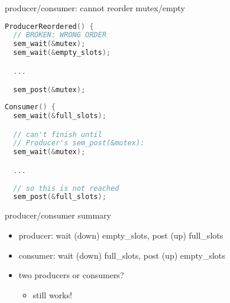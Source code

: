 \begin{frame}[fragile,label=noReorderEmpty]{producer/consumer: cannot reorder mutex/empty}
\begin{minipage}{0.45\textwidth}
\begin{lstlisting}[language=C++,style=smaller]
ProducerReordered() {
  // BROKEN: WRONG ORDER
  sem_wait(&mutex);
  sem_wait(&empty_slots);

  ...

  sem_post(&mutex);
\end{lstlisting}
\end{minipage}
\begin{minipage}{0.45\textwidth}
\begin{lstlisting}[language=C++,style=smaller]
Consumer() {
  sem_wait(&full_slots);

  // can't finish until
  // Producer's sem_post(&mutex):
  sem_wait(&mutex);

  ...
    
  // so this is not reached
  sem_post(&full_slots);
\end{lstlisting}
\end{minipage}
\end{frame}


\begin{frame}{producer/consumer summary}
    \begin{itemize}
    \item producer: wait (down) empty\_slots, post (up) full\_slots
    \item consumer: wait (down) full\_slots, post (up) empty\_slots
    \vspace{.5cm}
    \item two producers or consumers?
        \begin{itemize}
        \item still works!
        \end{itemize}
    \end{itemize}
\end{frame}
